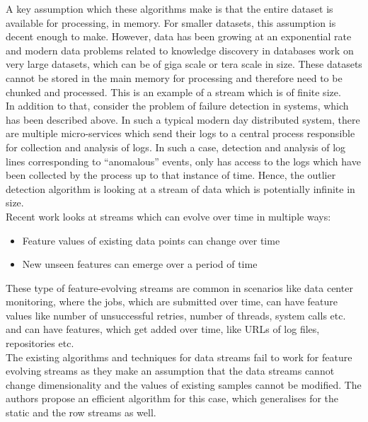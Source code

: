 A key assumption which these algorithms make is that the entire dataset is available for processing, in memory. For smaller datasets, this assumption is decent enough to make. However, data has been growing at an exponential rate and modern data problems related to knowledge discovery in databases work on very large datasets, which can be of giga scale or tera scale in size. These datasets cannot be stored in the main memory for processing and therefore need to be chunked and processed. This is an example of a stream which is of finite size. \\

In addition to that, consider the problem of failure detection in systems, which has been described above. In such a typical modern day distributed system, there are multiple micro-services which send their logs to a central process responsible for collection and analysis of logs. In such a case, detection and analysis of log lines corresponding to ``anomalous'' events, only has access to the logs which have been collected by the process up to that instance of time. Hence, the outlier detection algorithm is looking at a stream of data which is potentially infinite in size. \\

Recent work\cite{Manzoor:2018:XOD:3219819.3220107} looks at streams which can evolve over time in multiple ways:

\begin{itemize}
    \item Feature values of existing data points can change over time
    \item New unseen features can emerge over a period of time
\end{itemize}

These type of feature-evolving streams are common in scenarios like data center monitoring, where the jobs, which are submitted over time, can have feature values like number of unsuccessful retries, number of threads, system calls etc. and can have features, which get added over time, like URLs of log files, repositories etc. \\

The existing algorithms and techniques for data streams fail to work for feature evolving streams as they make an assumption that the data streams cannot change dimensionality and the values of existing samples cannot be modified. The authors propose an efficient algorithm for this case, which generalises for the static and the row streams as well.

